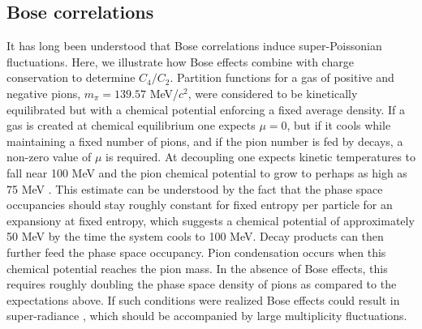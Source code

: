 \documentclass[aps,prc,nofootinbib,showpacs,superscriptaddress,groupedaddress]{revtex4-1}
\begin{document}
\subsection{Bose correlations}

It has long been understood that Bose correlations induce super-Poissonian fluctuations. Here, we illustrate how Bose effects combine with charge conservation to determine $C_4/C_2$. Partition functions for a gas of positive and negative pions, $m_\pi=139.57$ MeV/$c^2$, were considered to be kinetically equilibrated but with a chemical potential enforcing a fixed average density. If a gas is created at chemical equilibrium one expects $\mu=0$, but if it cools while maintaining a fixed number of pions, and if the pion number is fed by decays, a non-zero value of $\mu$ is required. At decoupling one expects kinetic temperatures to fall near 100 MeV and the pion chemical potential to grow to perhaps as high as 75 MeV \cite{Greiner:1993jn}. This estimate can be understood by the fact that the phase space occupancies should stay roughly constant for fixed entropy per particle for an expansiony at fixed entropy, which suggests a chemical potential of approximately 50 MeV by the time the system cools to 100 MeV. Decay products can then further feed the phase space occupancy. Pion condensation occurs when this chemical potential reaches the pion mass. In the absence of Bose effects, this requires roughly doubling the phase space density of pions as compared to the expectations above. If such conditions were realized Bose effects could result in super-radiance \cite{}, which should be accompanied by large multiplicity fluctuations. 
\end{document}
